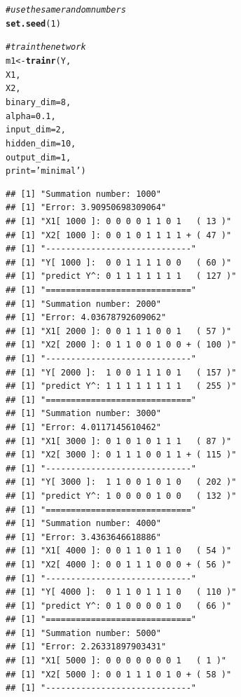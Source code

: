 \documentclass[british]{article}\usepackage[]{graphicx}\usepackage[]{color}
\makeatletter
\newcommand{\hlnum}[1]{\textcolor[rgb]{0.686,0.059,0.569}{#1}}%
\newcommand{\hlstr}[1]{\textcolor[rgb]{0.192,0.494,0.8}{#1}}%
\newcommand{\hlcom}[1]{\textcolor[rgb]{0.678,0.584,0.686}{\textit{#1}}}%
\newcommand{\hlstd}[1]{\textcolor[rgb]{0.345,0.345,0.345}{#1}}%
\newcommand{\hlkwb}[1]{\textcolor[rgb]{0.69,0.353,0.396}{#1}}%
\newcommand{\hlkwc}[1]{\textcolor[rgb]{0.333,0.667,0.333}{#1}}%
\newcommand{\hlkwd}[1]{\textcolor[rgb]{0.737,0.353,0.396}{\textbf{#1}}}%
\newenvironment{kframe}{%
 \def\at@end@of@kframe{}%
 \ifinner\ifhmode%
  \def\at@end@of@kframe{\end{minipage}}%
  \begin{minipage}{\columnwidth}%
 \fi\fi%
 \def\FrameCommand##1{\hskip\@totalleftmargin \hskip-\fboxsep
 \colorbox{shadecolor}{##1}\hskip-\fboxsep
     \hskip-\linewidth \hskip-\@totalleftmargin \hskip\columnwidth}%
 \MakeFramed {\advance\hsize-\width
   \@totalleftmargin\z@ \linewidth\hsize
   \@setminipage}}%
 {\par\unskip\endMakeFramed%
 \at@end@of@kframe}
\newenvironment{knitrout}{}{} %
\makeatother
\begin{document}
\begin{table}[H]
\caption{trainr() Output}


\begin{knitrout}\tiny
{}\color{fgcolor}\begin{kframe}
\begin{alltt}
\hlcom{# use the same random numbers}
\hlkwd{set.seed}\hlstd{(}\hlnum{1}\hlstd{)}

\hlcom{# train the network}
\hlstd{m1} \hlkwb{<-} \hlkwd{trainr}\hlstd{(Y,}
             \hlstd{X1,}
             \hlstd{X2,}
             \hlkwc{binary_dim} \hlstd{=}  \hlnum{8}\hlstd{,}
             \hlkwc{alpha}      \hlstd{=}  \hlnum{0.1}\hlstd{,}
             \hlkwc{input_dim}  \hlstd{=}  \hlnum{2}\hlstd{,}
             \hlkwc{hidden_dim} \hlstd{=} \hlnum{10}\hlstd{,}
             \hlkwc{output_dim} \hlstd{=}  \hlnum{1}\hlstd{,}
             \hlkwc{print} \hlstd{=} \hlstr{'minimal'} \hlstd{)}
\end{alltt}
\begin{verbatim}
## [1] "Summation number: 1000"
## [1] "Error: 3.90950698309064"
## [1] "X1[ 1000 ]: 0 0 0 0 1 1 0 1   ( 13 )"
## [1] "X2[ 1000 ]: 0 0 1 0 1 1 1 1 + ( 47 )"
## [1] "-----------------------------"
## [1] "Y[ 1000 ]:  0 0 1 1 1 1 0 0   ( 60 )"
## [1] "predict Y^: 0 1 1 1 1 1 1 1   ( 127 )"
## [1] "============================="
## [1] "Summation number: 2000"
## [1] "Error: 4.03678792609062"
## [1] "X1[ 2000 ]: 0 0 1 1 1 0 0 1   ( 57 )"
## [1] "X2[ 2000 ]: 0 1 1 0 0 1 0 0 + ( 100 )"
## [1] "-----------------------------"
## [1] "Y[ 2000 ]:  1 0 0 1 1 1 0 1   ( 157 )"
## [1] "predict Y^: 1 1 1 1 1 1 1 1   ( 255 )"
## [1] "============================="
## [1] "Summation number: 3000"
## [1] "Error: 4.0117145610462"
## [1] "X1[ 3000 ]: 0 1 0 1 0 1 1 1   ( 87 )"
## [1] "X2[ 3000 ]: 0 1 1 1 0 0 1 1 + ( 115 )"
## [1] "-----------------------------"
## [1] "Y[ 3000 ]:  1 1 0 0 1 0 1 0   ( 202 )"
## [1] "predict Y^: 1 0 0 0 0 1 0 0   ( 132 )"
## [1] "============================="
## [1] "Summation number: 4000"
## [1] "Error: 3.4363646618886"
## [1] "X1[ 4000 ]: 0 0 1 1 0 1 1 0   ( 54 )"
## [1] "X2[ 4000 ]: 0 0 1 1 1 0 0 0 + ( 56 )"
## [1] "-----------------------------"
## [1] "Y[ 4000 ]:  0 1 1 0 1 1 1 0   ( 110 )"
## [1] "predict Y^: 0 1 0 0 0 0 1 0   ( 66 )"
## [1] "============================="
## [1] "Summation number: 5000"
## [1] "Error: 2.26331897903431"
## [1] "X1[ 5000 ]: 0 0 0 0 0 0 0 1   ( 1 )"
## [1] "X2[ 5000 ]: 0 0 1 1 1 0 1 0 + ( 58 )"
## [1] "-----------------------------"

\end{verbatim}
\end{kframe}
\end{knitrout}
\end{table}
\end{document}
